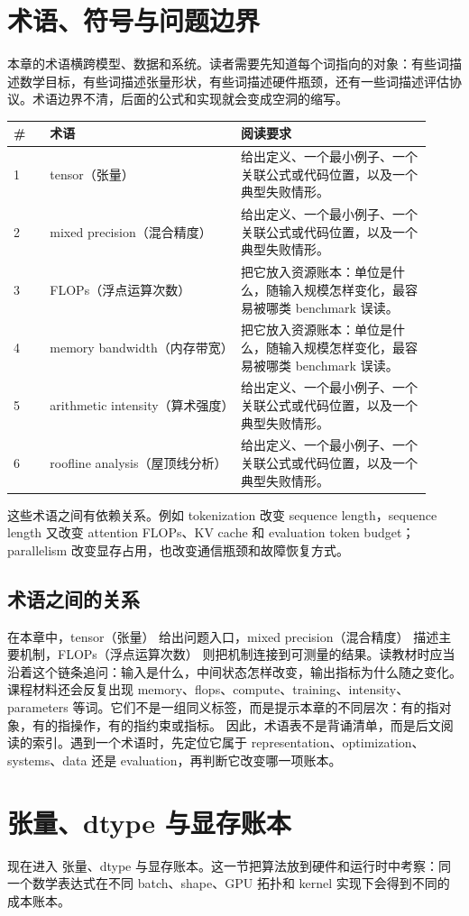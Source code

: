 \documentclass[a4paper]{article}
\begin{document}
\section{术语、符号与问题边界}
本章的术语横跨模型、数据和系统。读者需要先知道每个词指向的对象：有些词描述数学目标，有些词描述张量形状，有些词描述硬件瓶颈，还有一些词描述评估协议。术语边界不清，后面的公式和实现就会变成空洞的缩写。
\begin{longtable}{p{0.08\linewidth}p{0.42\linewidth}p{0.42\linewidth}}
\toprule
\textbf{\#} & \textbf{术语} & \textbf{阅读要求}\\
\midrule
1 & tensor（张量） & 给出定义、一个最小例子、一个关联公式或代码位置，以及一个典型失败情形。\\
2 & mixed precision（混合精度） & 给出定义、一个最小例子、一个关联公式或代码位置，以及一个典型失败情形。\\
3 & FLOPs（浮点运算次数） & 把它放入资源账本：单位是什么，随输入规模怎样变化，最容易被哪类 benchmark 误读。\\
4 & memory bandwidth（内存带宽） & 把它放入资源账本：单位是什么，随输入规模怎样变化，最容易被哪类 benchmark 误读。\\
5 & arithmetic intensity（算术强度） & 给出定义、一个最小例子、一个关联公式或代码位置，以及一个典型失败情形。\\
6 & roofline analysis（屋顶线分析） & 给出定义、一个最小例子、一个关联公式或代码位置，以及一个典型失败情形。\\
\bottomrule
\end{longtable}
这些术语之间有依赖关系。例如 tokenization 改变 sequence length，sequence length 又改变 attention FLOPs、KV cache 和 evaluation token budget；parallelism 改变显存占用，也改变通信瓶颈和故障恢复方式。
\subsection{术语之间的关系}
在本章中，tensor（张量） 给出问题入口，mixed precision（混合精度） 描述主要机制，FLOPs（浮点运算次数） 则把机制连接到可测量的结果。读教材时应当沿着这个链条追问：输入是什么，中间状态怎样改变，输出指标为什么随之变化。
课程材料还会反复出现 memory、flops、compute、training、intensity、parameters 等词。它们不是一组同义标签，而是提示本章的不同层次：有的指对象，有的指操作，有的指约束或指标。
因此，术语表不是背诵清单，而是后文阅读的索引。遇到一个术语时，先定位它属于 representation、optimization、systems、data 还是 evaluation，再判断它改变哪一项账本。
\section{张量、dtype 与显存账本}
现在进入 张量、dtype 与显存账本。这一节把算法放到硬件和运行时中考察：同一个数学表达式在不同 batch、shape、GPU 拓扑和 kernel 实现下会得到不同的成本账本。
\end{document}
